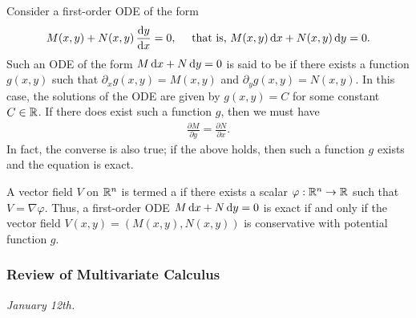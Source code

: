 Consider a first-order ODE of the form
\begin{align}
    M(x,y) + N(x,y) \, \frac{\mathrm{d}y}{\mathrm{d}x} = 0, \quad \text{ that is, } M(x,y) \, \mathrm{d}x + N(x,y) \, \mathrm{d}y = 0.
\end{align}
Such an ODE of the form $M \, \mathrm{d}x + N \, \mathrm{d}y = 0$ is said to be  if there exists a function $g(x,y)$ such that $\partial_{x} g(x,y) = M(x,y)$ and $\partial_{y} g(x,y) = N(x,y)$. In this case, the solutions of the ODE are given by $g(x,y) = C$ for some constant $C \in \mathbb{R}$. If there does exist such a function $g$, then we must have
\begin{align}
    \frac{\partial M}{\partial y} = \frac{\partial N}{\partial x}.
\end{align}
In fact, the converse is also true; if the above holds, then such a function $g$ exists and the equation is exact.

A vector field $V$ on $\mathbb{R}^{n}$ is termed a  if there exists a scalar  $\varphi : \mathbb{R}^{n} \to \mathbb{R}$ such that $V = \nabla \varphi$. Thus, a first-order ODE $M \, \mathrm{d}x + N \, \mathrm{d}y = 0$ is exact if and only if the vector field $V(x,y) = (M(x,y), N(x,y))$ is conservative with potential function $g$.

\subsubsection{Review of Multivariate Calculus}
\textit{January 12th.}

